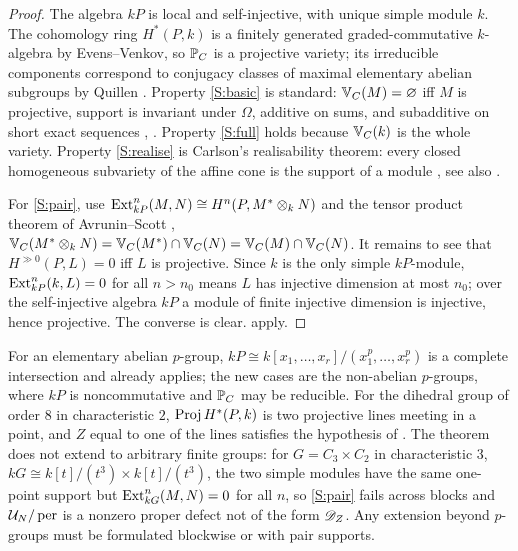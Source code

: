 \begin{proof}
The algebra \(kP\) is local and self-injective, with unique simple module \(k\).  The cohomology ring \(H^*(P,k)\) is a finitely generated graded-commutative \(k\)-algebra by Evens--Venkov, so \(\mathbb P_C\) is a projective variety; its irreducible components correspond to conjugacy classes of maximal elementary abelian subgroups by Quillen \cite{Quillen71}.  Property \ref{S:basic} is standard: \(\mathbb V_C(M)=\varnothing\) iff \(M\) is projective, support is invariant under \(\Omega\), additive on sums, and subadditive on short exact sequences \cite{Carlson83}, \cite[Chapter~5]{BensonII}.  Property \ref{S:full} holds because \(\mathbb V_C(k)\) is the whole variety.  Property \ref{S:realise} is Carlson's realisability theorem: every closed homogeneous subvariety of the affine cone is the support of a module \cite{Carlson83,Carlson84}, see also \cite[Chapter~5]{BensonII}.

For \ref{S:pair}, use \(\operatorname{Ext}^n_{kP}(M,N)\cong H^n(P,M^*\otimes_kN)\) and the tensor product theorem of Avrunin--Scott \cite{AvruninScott82}, \(\mathbb V_C(M^*\otimes_kN)=\mathbb V_C(M^*)\cap\mathbb V_C(N)=\mathbb V_C(M)\cap\mathbb V_C(N)\).  It remains to see that \(H^{\gg0}(P,L)=0\) iff \(L\) is projective.  Since \(k\) is the only simple \(kP\)-module, \(\operatorname{Ext}^n_{kP}(k,L)=0\) for all \(n>n_0\) means \(L\) has injective dimension at most \(n_0\); over the self-injective algebra \(kP\) a module of finite injective dimension is injective, hence projective.  The converse is clear.   apply.
\end{proof}

\begin{remark}
For an elementary abelian \(p\)-group, \(kP\cong k[x_1,\dots,x_r]/(x_1^p,\dots,x_r^p)\) is a complete intersection and  already applies; the new cases are the non-abelian \(p\)-groups, where \(kP\) is noncommutative and \(\mathbb P_C\) may be reducible.  For the dihedral group of order \(8\) in characteristic \(2\), \(\operatorname{Proj} H^*(P,k)\) is two projective lines meeting in a point, and \(Z\) equal to one of the lines satisfies the hypothesis of .  The theorem does not extend to arbitrary finite groups: for \(G=C_3\times C_2\) in characteristic \(3\), \(kG\cong k[t]/(t^3)\times k[t]/(t^3)\), the two simple modules have the same one-point support but \(\operatorname{Ext}^n_{kG}(M,N)=0\) for all \(n\), so \ref{S:pair} fails across blocks and \(\mathcal U_N/\operatorname{per}\) is a nonzero proper defect not of the form \(\mathscr D_Z\).  Any extension beyond \(p\)-groups must be formulated blockwise or with pair supports.
\end{remark}
